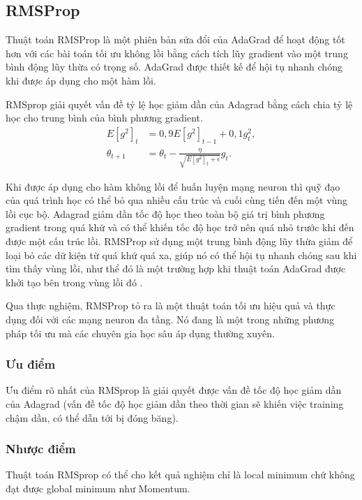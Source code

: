 \documentclass[11pt,oneside,a4paper]{report}
\theoremstyle{definition}
\begin{document}
\subsection{RMSProp}
Thuật toán RMSProp là một phiên bản sửa đổi của AdaGrad để hoạt động tốt hơn với các bài toán tối ưu không lồi bằng cách tích lũy gradient vào một trung bình động lũy thừa có trọng số. AdaGrad được thiết kế để hội tụ nhanh chóng khi được áp dụng cho một hàm lồi.

RMSprop giải quyết vấn đề tỷ lệ học giảm dần của Adagrad bằng cách chia tỷ lệ học cho trung bình của bình phương gradient.
$$
\begin{aligned}
E\left[g^2\right]_t &=0,9 E\left[g^2\right]_{t-1}+0,1 g_t^2, \\
\theta_{t+1} &=\theta_t-\frac{\eta}{\sqrt{E\left[g^2\right]_t+\epsilon}} g_t.
\end{aligned}
$$

Khi được áp dụng cho hàm không lồi để huấn luyện mạng neuron thì quỹ đạo của quá trình học có thể bỏ qua nhiều cấu trúc và cuối cùng tiến đến một vùng lồi cục bộ. Adagrad giảm dần tốc độ học theo toàn bộ giá trị bình phương gradient trong quá khứ và có thể khiến tốc độ học trở nên quá nhỏ trước khi đến được một cấu trúc lồi. RMSProp sử dụng một trung bình động lũy thừa giảm để loại bỏ các dữ kiện từ quá khứ quá xa, giúp nó có thể hội tụ nhanh chóng sau khi tìm thấy vùng lồi, như thể đó là một trường hợp khi thuật toán AdaGrad được khởi tạo bên trong vùng lồi đó \cite{1}.

Qua thực nghiệm, RMSProp tỏ ra là một thuật toán tối ưu hiệu quả và thực dụng đối với các mạng neuron đa tầng. Nó đang là một trong những phương pháp tối ưu mà các chuyên gia học sâu áp dụng thường xuyên.
\subsubsection{Ưu điểm}
Ưu điểm rõ nhất của RMSprop là giải quyết được vấn đề tốc độ học giảm dần của Adagrad (vấn đề tốc độ học giảm dần theo thời gian sẽ khiến việc training chậm dần, có thể dẫn tới bị đóng băng).
\subsubsection{Nhược điểm}
Thuật toán RMSprop có thể cho kết quả nghiệm chỉ là local minimum chứ không đạt được global minimum như Momentum.
\end{document}
